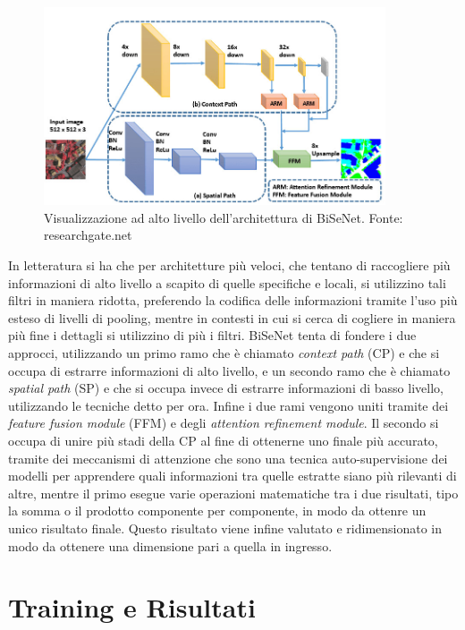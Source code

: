 \begin{figure}
    \center
    \includegraphics[width=0.9\textwidth]{./assets/bisenet.jpg}
    \caption{\label{fig:bisenet}Visualizzazione ad alto livello dell'architettura di BiSeNet. Fonte: researchgate.net}
\end{figure}

In letteratura si ha che per architetture più veloci, che tentano
di raccogliere più informazioni di alto livello a scapito di quelle
specifiche e locali, si utilizzino tali filtri in maniera ridotta,
preferendo la codifica delle informazioni tramite l'uso più esteso
di livelli di pooling, mentre in contesti in cui si cerca di
cogliere in maniera più fine i dettagli si utilizzino di più i filtri.
BiSeNet tenta di fondere i due approcci, utilizzando un primo ramo
che è chiamato {\it context path} (CP) e che si occupa di estrarre
informazioni di alto livello, e un secondo ramo che è chiamato
{\it spatial path} (SP) e che si occupa invece di estrarre informazioni
di basso livello, utilizzando le tecniche detto per ora.
Infine i due rami vengono uniti tramite dei
{\it feature fusion module} (FFM) e degli
{\it attention refinement module}.
Il secondo si occupa di unire più stadi della CP al fine di ottenerne
uno finale più accurato, tramite dei meccanismi di attenzione che sono
una tecnica auto-supervisione dei modelli per apprendere quali 
informazioni tra quelle estratte siano più rilevanti di altre,
mentre il primo esegue varie operazioni matematiche tra i due
risultati, tipo la somma o il prodotto componente per componente, 
in modo da ottenre un unico risultato finale.
Questo risultato viene infine valutato e ridimensionato in modo
da ottenere una dimensione pari a quella in ingresso.

\section{Training e Risultati}

